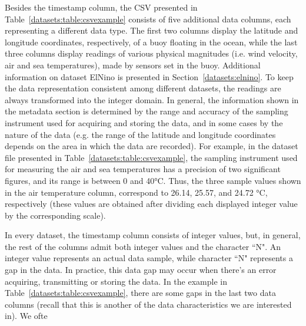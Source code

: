 Besides the timestamp column, the CSV presented in Table~\ref{datasets:table:csvexample} consists of five additional data columns, each representing a different data type. The first two columns display the latitude and longitude coordinates, respectively, of a buoy floating in the ocean, while the last three columns display readings of various physical magnitudes (i.e. wind velocity, air and sea temperatures), made by sensors set in the buoy. Additional information on dataset ElNino \cite{dataset:elnino} is presented in Section~\ref{datasets:elnino}. To keep the data representation consistent among different datasets, the readings are always transformed into the integer domain. In general, the information shown in the metadata section is determined by the range and accuracy of the sampling instrument used for acquiring and storing the data, and in some cases by the nature of the data (e.g. the range of the latitude and longitude coordinates depends on the area in which the data are recorded). For example, in the dataset file presented in Table~\ref{datasets:table:csvexample}, the sampling instrument used for measuring the air and sea temperatures has a precision of two significant figures, and its range is between 0 and 40°C. Thus, the three sample values shown in the air temperature column, correspond to 26.14, 25.57, and 24.72 °C, respectively (these values are obtained after dividing each displayed integer value by the corresponding scale). 


In every dataset, the timestamp column consists of integer values, but, in general, the rest of the columns admit both integer values and the character ``N". An integer value represents an actual data sample, while character ``N" represents a gap in the data. In practice, this data gap may occur when there's an error acquiring, transmitting or storing the data. In the example in Table~\ref{datasets:table:csvexample}, there are some gaps in the last two data columns (recall that this is another of the data characteristics we are interested in). We ofte

